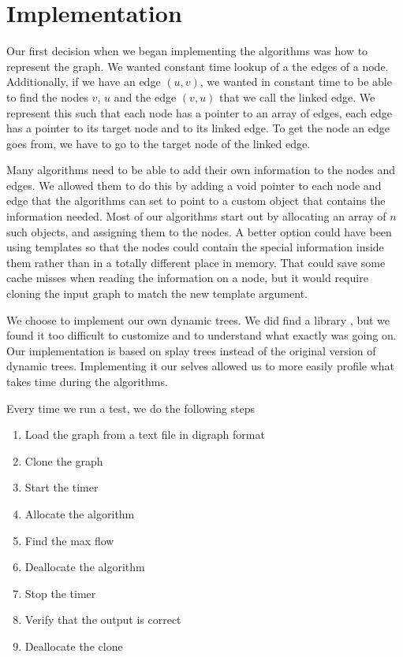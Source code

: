 
\section{Implementation}
\label{ImplementationSection}

Our first decision when we began implementing the algorithms was how to represent the graph.
We wanted constant time lookup of a the edges of a node. Additionally, if we have an edge $(u, v)$, 
we wanted in constant time to be able to find the nodes $v$, $u$ and the edge $(v, u)$ that we call the linked edge.
We represent this such that each node has a pointer to an array of edges, each edge has a pointer to its target node and to its linked edge.
To get the node an edge goes from, we have to go to the target node of the linked edge.

Many algorithms need to be able to add their own information to the nodes and edges.
We allowed them to do this by adding a void pointer to each node and edge that the algorithms can set to point to a custom object that contains the information needed.
Most of our algorithms start out by allocating an array of $n$ such objects, and assigning them to the nodes.
A better option could have been using templates so that the nodes could contain the special information inside them rather than in a totally different place in memory.
That could save some cache misses when reading the information on a node, but it would require cloning the input graph to match the new template argument.

We choose to implement our own dynamic trees. We did find a library \cite{dtreeLibrary}, but we found it too difficult to customize and to understand what exactly was going on.
Our implementation is based on splay trees instead of the original version of dynamic trees.
Implementing it our selves allowed us to more easily profile what takes time during the algorithms.

Every time we run a test, we do the following steps
\begin{enumerate}
  \item Load the graph from a text file in digraph format
  \item Clone the graph
  \item Start the timer
  \item Allocate the algorithm
  \item Find the max flow
  \item Deallocate the algorithm
  \item Stop the timer
  \item Verify that the output is correct
  \item Deallocate the clone
\end{enumerate}


